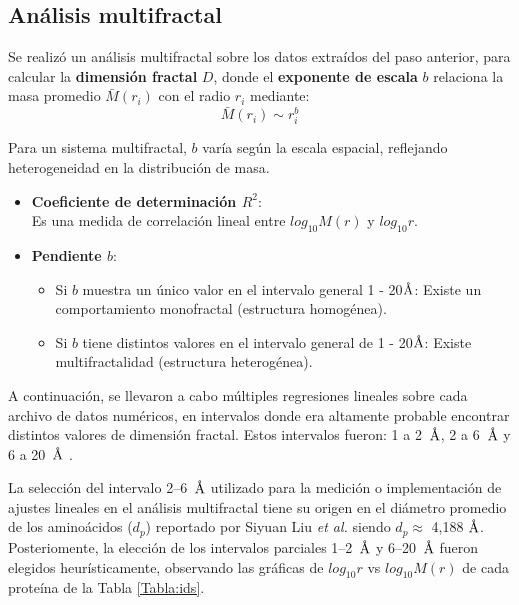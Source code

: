 	
	\subsection{An\'{a}lisis multifractal}
	
	Se realiz\'{o} un an\'{a}lisis multifractal sobre los datos extra\'{i}dos del paso anterior, para calcular la \textbf{dimensi\'{o}n fractal} $D$, donde el \textbf{exponente de escala} $b$  relaciona la masa  promedio $\bar{M}(r_i)$ con el radio $r_{i}$ mediante:
	\begin{equation}
		\bar{M}(r_i) \sim r_{i}^b
	\end{equation}
	
	Para un sistema multifractal, $b$ var\'{i}a seg\'{u}n la escala espacial, reflejando heterogeneidad en la distribuci\'{o}n de masa.
	\begin{itemize}
		\item \textbf{Coeficiente de determinaci\'{o}n $R^{2}$}: \\ Es una medida de correlaci\'{o}n lineal entre $log_{10}M(r)$ y $log_{10}r$.
		\item \textbf{Pendiente $b$}:
		\begin{itemize}
			\item Si $b$ muestra un \'{u}nico valor en el intervalo general 1 - 20$\textup{\r{A}}$: Existe un comportamiento monofractal (estructura homog\'{e}nea).
			\item Si $b$  tiene distintos valores en el intervalo general de 1 - 20$\textup{\r{A}}$: Existe multifractalidad (estructura heterog\'{e}nea).
		\end{itemize}
	\end{itemize}
	
	A continuaci\'{o}n, se llevaron a cabo m\'{u}ltiples regresiones lineales sobre cada archivo de datos num\'{e}ricos, en intervalos donde era altamente probable encontrar distintos valores de dimensi\'{o}n fractal. Estos intervalos fueron: 1 a 2~$\textup{\r{A}}$, 2 a 6~$\textup{\r{A}}$ y 6 a 20~$\textup{\r{A}}$ \cite{Enright2005, Liu2020}.	
	
	
	
	La selecci\'on del intervalo 2--6~$\textup{\r{A}}$ utilizado para la medici\'on o implementaci\'on de ajustes lineales en el an\'alisis multifractal tiene su origen en el di\'ametro promedio de los amino\'acidos ($d_p$) reportado por Siyuan Liu \textit{et al.}  siendo $d_p \approx$ 4,188 $\textup{\r{A}}$. Posteriomente, la elecci\'{o}n de los intervalos parciales 1--2~$\textup{\r{A}}$ y 6--20~$\textup{\r{A}}$ fueron elegidos heur\'{i}sticamente, observando las gr\'{a}ficas de $log_{10}r$ vs $log_{10}M(r)$ de cada prote\'{i}na de la Tabla \ref{Tabla:ids}.
	
